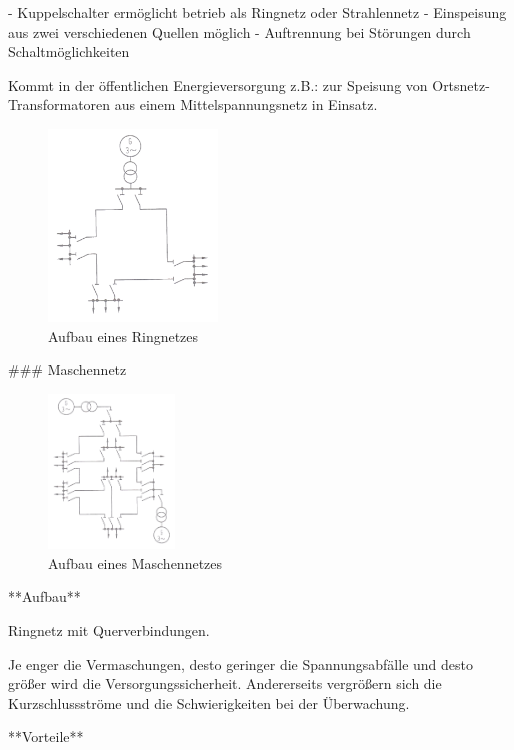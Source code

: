\begin{markdown}
- Kuppelschalter ermöglicht betrieb als Ringnetz oder Strahlennetz
- Einspeisung aus zwei verschiedenen Quellen möglich
- Auftrennung bei Störungen durch Schaltmöglichkeiten

Kommt in der öffentlichen Energieversorgung z.B.: zur Speisung von Ortsnetz-Transformatoren aus einem Mittelspannungsnetz in Einsatz.

\begin{figure}[H]
    \centering
    \includegraphics[width=0.4\textwidth]{./images/01-Netze/Ringnetz.png}
    \caption[Aufbau eines Ringnetzes]{Aufbau eines Ringnetzes}
\end{figure}

### Maschennetz

\begin{figure}
    \centering
    \includegraphics[width=0.3\textwidth]{./images/01-Netze/Maschennetz.png}
    \caption[Aufbau eines Maschennetzes]{Aufbau eines Maschennetzes}
\end{figure}

**Aufbau**

Ringnetz mit Querverbindungen.

Je enger die Vermaschungen, desto geringer die Spannungsabfälle und desto größer wird die Versorgungssicherheit. Andererseits vergrößern sich die Kurzschlussströme und die Schwierigkeiten bei der Überwachung.

**Vorteile**


\end{markdown}
